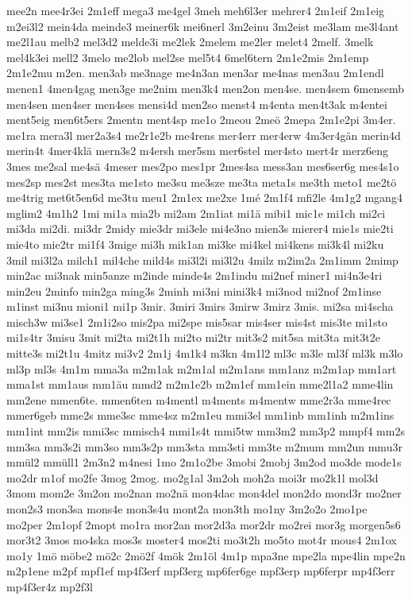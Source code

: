 {mee2n
mee4r3ei
2m1eff
mega3
me4gel
3meh
meh6l3er
mehrer4
2m1eif
2m1eig
m2ei3l2
mein4da
meinde3
meiner6k
mei6nerl
3m2einu
3m2eist
me3lam
me3l4ant
me2l1au
melb2
mel3d2
melde3i
me2lek
2melem
me2ler
melet4
2melf.
3melk
mel4k3ei
mell2
3melo
me2lob
mel2se
mel5t4
6mel6tern
2m1e2mis
2m1emp
2m1e2mu
m2en.
men3ab
me3nage
me4n3an
men3ar
me4nas
men3au
2m1endl
menen1
4men4gag
men3ge
me2nim
men3k4
men2on
men4se.
men4sem
6mensemb
men4sen
men4ser
men4ses
mensi4d
men2so
menst4
m4enta
men4t3ak
m4entei
ment5eig
men6t5ers
2mentn
ment4sp
me1o
2meou
2meö
2mepa
2m1e2pi
3m4er.
me1ra
mera3l
mer2a3s4
me2r1e2b
me4rens
mer4err
mer4erw
4m3er4gän
merin4d
merin4t
4mer4klä
mern3s2
m4ersh
mer5sm
mer6stel
mer4sto
mert4r
merz6eng
3mes
me2sal
me4sä
4meser
mes2po
mes1pr
2mes4sa
mess3an
mes6ser6g
mes4s1o
mes2sp
mes2st
mes3ta
me1sto
me3su
me3sze
me3ta
meta1s
me3th
meto1
me2tö
me4trig
met6t5en6d
me3tu
meu1
2m1ex
me2xe
1mé
2m1f4
mfi2le
4m1g2
mgang4
mglim2
4m1h2
1mi
mi1a
mia2b
mi2am
2m1iat
mi1ä
mibi1
mic1e
mi1ch
mi2ci
mi3da
mi2di.
mi3dr
2midy
mie3dr
mi3ele
mi4e3no
mien3s
mierer4
mie1s
mie2ti
mie4to
mie2tr
mi1f4
3mige
mi3h
mik1an
mi3ke
mi4kel
mi4kens
mi3k4l
mi2ku
3mil
mi3l2a
milch1
mil4che
mild4s
mi3l2i
mi3l2u
4milz
m2im2a
2m1imm
2mimp
min2ac
mi3nak
min5anze
m2inde
minde4s
2m1indu
mi2nef
miner1
mi4n3e4ri
min2eu
2minfo
min2ga
ming3s
2minh
mi3ni
mini3k4
mi3nod
mi2nof
2m1inse
m1inst
mi3nu
mioni1
mi1p
3mir.
3miri
3mirs
3mirw
3mirz
3mis.
mi2sa
mi4scha
misch3w
mi3se1
2m1i2so
mis2pa
mi2spe
mis5sar
mis4ser
mis4st
mis3te
mi1sto
mi1s4tr
3misu
3mit
mi2ta
mi2t1h
mi2to
mi2tr
mit3s2
mit5sa
mit3ta
mit3t2e
mitte3s
mi2t1u
4mitz
mi3v2
2m1j
4m1k4
m3kn
4m1l2
ml3c
m3le
ml3f
ml3k
m3lo
ml3p
ml3s
4m1m
mma3a
m2m1ak
m2m1al
m2m1ans
mm1anz
m2m1ap
mm1art
mma1st
mm1aus
mm1äu
mmd2
m2m1e2b
m2m1ef
mm1ein
mme2l1a2
mme4lin
mm2ene
mmen6te.
mmen6ten
m4mentl
m4ments
m4mentw
mme2r3a
mme4rec
mmer6geb
mme2s
mme3sc
mme4sz
m2m1eu
mmi3el
mm1inb
mm1inh
m2m1ins
mm1int
mm2is
mmi3sc
mmisch4
mmi1s4t
mmi5tw
mm3m2
mm3p2
mmpf4
mm2s
mm3sa
mm3s2i
mm3so
mm3s2p
mm3sta
mm3sti
mm3te
m2mum
mm2un
mmu3r
mmül2
mmüll1
2m3n2
m4nesi
1mo
2m1o2be
3mobi
2mobj
3m2od
mo3de
mode1s
mo2dr
m1of
mo2fe
3mog
2mog.
mo2g1al
3m2oh
moh2a
moi3r
mo2k1l
mol3d
3mom
mom2e
3m2on
mo2nan
mo2nä
mon4dac
mon4del
mon2do
mond3r
mo2ner
mon2s3
mon3sa
mons4e
mon3s4u
mont2a
mon3th
mo1ny
3m2o2o
2mo1pe
mo2per
2m1opf
2mopt
mo1ra
mor2an
mor2d3a
mor2dr
mo2rei
mor3g
morgen5s6
mor3t2
3mos
mo4ska
mos3s
moster4
mos2ti
mo3t2h
mo5to
mot4r
mous4
2m1ox
mo1y
1mö
möbe2
mö2c
2mö2f
4mök
2m1öl
4m1p
mpa3ne
mpe2la
mpe4lin
mpe2n
m2p1ene
m2pf
mpf1ef
mp4f3erf
mpf3erg
mp6fer6ge
mpf3erp
mp6ferpr
mp4f3err
mp4f3er4z
mp2f3l
}
